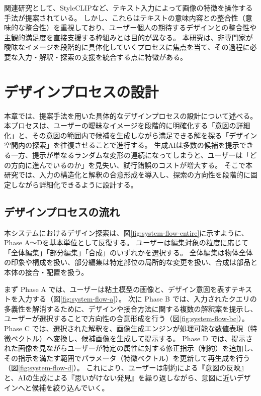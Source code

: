 \documentclass{kuisthesis}
\begin{document}
関連研究として、StyleCLIPなど、テキスト入力によって画像の特徴を操作する手法が提案されている。
しかし、これらはテキストの意味内容との整合性（意味的な整合性）を重視しており、ユーザー個人の期待するデザインとの整合性や主観的満足度を直接支援する枠組みとは目的が異なる。
本研究は、非専門家が曖昧なイメージを段階的に具体化していくプロセスに焦点を当て、その過程に必要な入力・解釈・探索の支援を統合する点に特徴がある。



\section{デザインプロセスの設計}
本章では、提案手法を用いた具体的なデザインプロセスの設計について述べる。
本プロセスは、ユーザーの曖昧なイメージを段階的に明確化する「意図の詳細化」と、その意図の範囲内で候補を生成しながら満足できる解を探る「デザイン空間内の探索」を往復させることで進行する。
生成AIは多数の候補を提示できる一方、提示が単なるランダムな変形の連続になってしまうと、ユーザーは「どの方向に進んでいるのか」を見失い、試行錯誤のコストが増大する。
そこで本研究では、入力の構造化と解釈の合意形成を導入し、探索の方向性を段階的に固定しながら詳細化できるように設計する。

\subsection{デザインプロセスの流れ}
本システムにおけるデザイン探索は、図\ref{fig:system-flow-entire}に示すように、Phase A〜Dを基本単位として反復する。
ユーザーは編集対象の粒度に応じて「全体編集」「部分編集」「合成」のいずれかを選択する。
全体編集は物体全体の印象や構成を扱い、部分編集は特定部位の局所的な変更を扱い、合成は部品と本体の接合・配置を扱う。

まず Phase A では、ユーザーは粘土模型の画像と、デザイン意図を表すテキストを入力する（図\ref{fig:system-flow-a}）。
次に Phase B では、入力されたクエリの多義性を解消するために、デザインや接合方法に関する複数の解釈案を提示し、ユーザーが選択することで方向性の合意形成を行う（図\ref{fig:system-flow-bc}）。
Phase C では、選択された解釈を、画像生成エンジンが処理可能な数値表現（特徴ベクトル）へ変換し、候補画像を生成して提示する。
Phase D では、提示された画像を見ながらユーザーが特定の属性に対する修正指示（制約）を追加し、その指示を満たす範囲でパラメータ（特徴ベクトル）を更新して再生成を行う（図\ref{fig:system-flow-d}）。
これにより、ユーザーは制約による『意図の反映』と、AIの生成による『思いがけない発見』を繰り返しながら、意図に近いデザインへと候補を絞り込んでいく。
\end{document}
